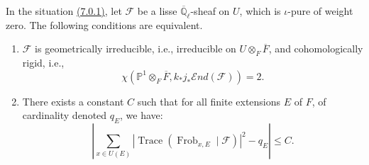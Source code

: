 In the situation \hyperref[par:7.0.1]{(7.0.1)}, let \(\mathcal{F}\) be a lisse \(\overline{\mathbb{Q}}_\ell\)-sheaf on \(U\), which is \(\iota\)-pure of weight zero. The following conditions are equivalent.
\begin{enumerate}[label=(\arabic*)]
\item \(\mathcal{F}\) is geometrically irreducible, i.e., irreducible on \(U\otimes_F\overline{F}\), and cohomologically rigid, i.e.,
\[
\chi(\mathbb{P}^1\otimes_F\overline{F},k_*j_*\mathcal{E}nd(\mathcal{F}))=2.
\]
\item There exists a constant \(C\) such that for all finite extensions \(E\) of \(F\), of cardinality denoted \(q_E\), we have:
\[
\left|\sum_{x\in U(E)}|\operatorname{Trace}(\operatorname{Frob}_{x,E}\mid\mathcal{F})|^2-q_E\right|\leq C.
\]
\end{enumerate}
